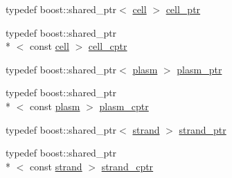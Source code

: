 \begin{DoxyCompactItemize}
\item 
typedef boost\-::shared\-\_\-ptr$<$ \hyperlink{structecto_1_1cell}{cell} $>$ \hyperlink{namespaceecto_aed1809e82b9229ea81ef9ee3438cf62c}{cell\-\_\-ptr}
\item 
typedef boost\-::shared\-\_\-ptr\\*
$<$ const \hyperlink{structecto_1_1cell}{cell} $>$ \hyperlink{namespaceecto_ab708c826226c91fd6f3c8c121f293a78}{cell\-\_\-cptr}
\item 
typedef boost\-::shared\-\_\-ptr$<$ \hyperlink{structecto_1_1plasm}{plasm} $>$ \hyperlink{namespaceecto_a6b83be6cd685db71f03b14871653475f}{plasm\-\_\-ptr}
\item 
typedef boost\-::shared\-\_\-ptr\\*
$<$ const \hyperlink{structecto_1_1plasm}{plasm} $>$ \hyperlink{namespaceecto_a5a9973f00c94e30353acb27c3d2fa836}{plasm\-\_\-cptr}
\item 
typedef boost\-::shared\-\_\-ptr$<$ \hyperlink{structecto_1_1strand}{strand} $>$ \hyperlink{namespaceecto_a98ca3b7b690de778292922c806e7588d}{strand\-\_\-ptr}
\item 
typedef boost\-::shared\-\_\-ptr\\*
$<$ const \hyperlink{structecto_1_1strand}{strand} $>$ \hyperlink{namespaceecto_abbad20d834739bbf762269e4e04a6732}{strand\-\_\-cptr}
\end{DoxyCompactItemize}
